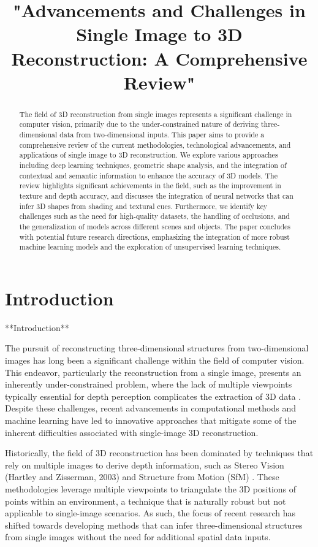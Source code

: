 \documentclass[conference]{IEEEtran}
\title{"Advancements and Challenges in Single Image to 3D Reconstruction: A Comprehensive Review"}
\author{
            \IEEEauthorblockN{John Doe}
            \IEEEauthorblockA{
            Department of Computer Science\\
            University Example\\
            City, Country\\
            email@example.com}
            \and
            \IEEEauthorblockN{Jane Smith}
            \IEEEauthorblockA{
            Department of Research\\
            University Sample\\
            City, Country\\
            email2@example.com}
            \and
            \IEEEauthorblockN{Alex Johnson}
            \IEEEauthorblockA{
            Research Institute\\
            Organization Name\\
            City, Country\\
            email3@example.com}
            }
\begin{document}
            \maketitle

            \begin{abstract}
            The field of 3D reconstruction from single images represents a significant challenge in computer vision, primarily due to the under-constrained nature of deriving three-dimensional data from two-dimensional inputs. This paper aims to provide a comprehensive review of the current methodologies, technological advancements, and applications of single image to 3D reconstruction. We explore various approaches including deep learning techniques, geometric shape analysis, and the integration of contextual and semantic information to enhance the accuracy of 3D models. The review highlights significant achievements in the field, such as the improvement in texture and depth accuracy, and discusses the integration of neural networks that can infer 3D shapes from shading and textural cues. Furthermore, we identify key challenges such as the need for high-quality datasets, the handling of occlusions, and the generalization of models across different scenes and objects. The paper concludes with potential future research directions, emphasizing the integration of more robust machine learning models and the exploration of unsupervised learning techniques.
            \end{abstract}

            \section{Introduction}

**Introduction**

The pursuit of reconstructing three-dimensional structures from two-dimensional images has long been a significant challenge within the field of computer vision. This endeavor, particularly the reconstruction from a single image, presents an inherently under-constrained problem, where the lack of multiple viewpoints typically essential for depth perception complicates the extraction of 3D data \cite{fan2016}. Despite these challenges, recent advancements in computational methods and machine learning have led to innovative approaches that mitigate some of the inherent difficulties associated with single-image 3D reconstruction.

Historically, the field of 3D reconstruction has been dominated by techniques that rely on multiple images to derive depth information, such as Stereo Vision (Hartley and Zisserman, 2003) and Structure from Motion (SfM) \cite{ullman1979}. These methodologies leverage multiple viewpoints to triangulate the 3D positions of points within an environment, a technique that is naturally robust but not applicable to single-image scenarios. As such, the focus of recent research has shifted towards developing methods that can infer three-dimensional structures from single images without the need for additional spatial data inputs.
\end{document}
